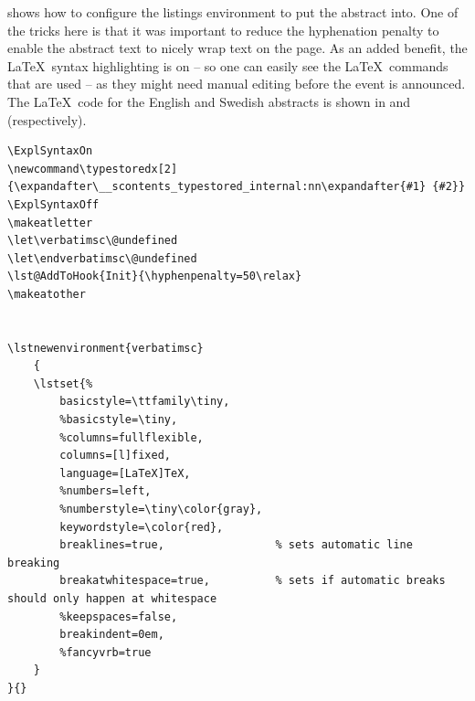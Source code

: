  shows how to configure the listings environment to put the abstract into. One of the tricks here is that it was important to reduce the hyphenation penalty to enable the abstract text to nicely wrap text on the page. As an added benefit, the \LaTeX~syntax highlighting is on – so one can easily see the \LaTeX~commands that are used – as they might need manual editing before the event is announced. The \LaTeX~code for the English and Swedish abstracts is shown in  and  (respectively).
\clearpage
\begin{lstlisting}[language={[LaTeX]TeX}, caption={Code in the document file to set up the command \textbackslash typestoredx and to configure the listing environment to put the abstract into}, label=lst:setupTypestoreedx] 
\ExplSyntaxOn
\newcommand\typestoredx[2]{\expandafter\__scontents_typestored_internal:nn\expandafter{#1} {#2}}
\ExplSyntaxOff
\makeatletter
\let\verbatimsc\@undefined
\let\endverbatimsc\@undefined
\lst@AddToHook{Init}{\hyphenpenalty=50\relax}
\makeatother


\lstnewenvironment{verbatimsc}
    {
    \lstset{%
        basicstyle=\ttfamily\tiny,
        %basicstyle=\tiny,
        %columns=fullflexible,
        columns=[l]fixed,
        language=[LaTeX]TeX,
        %numbers=left,
        %numberstyle=\tiny\color{gray},
        keywordstyle=\color{red},
        breaklines=true,                 % sets automatic line breaking
        breakatwhitespace=true,          % sets if automatic breaks should only happen at whitespace
        %keepspaces=false,
        breakindent=0em,
        %fancyvrb=true
    }
}{}
\end{lstlisting}
\clearpage

